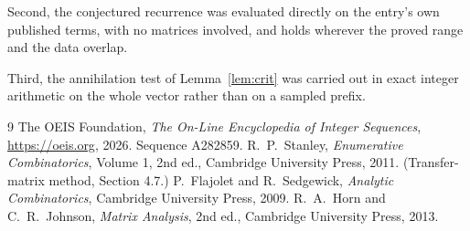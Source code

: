 \documentclass[11pt,a4paper]{article}
\theoremstyle{plain}
\theoremstyle{definition}
\begin{document}
Second, the conjectured recurrence was evaluated directly on the entry's own published terms,
with no matrices involved, and holds wherever the proved range and the data overlap.

Third, the annihilation test of Lemma~\ref{lem:crit} was carried out in exact integer
arithmetic on the whole vector rather than on a sampled prefix.

\begin{thebibliography}{9}
 The OEIS Foundation, \emph{The On-Line Encyclopedia of Integer
Sequences}, \url{https://oeis.org}, 2026. Sequence A282859.
 R.~P.~Stanley, \emph{Enumerative Combinatorics}, Volume 1, 2nd ed.,
Cambridge University Press, 2011. (Transfer-matrix method, Section 4.7.)
 P.~Flajolet and R.~Sedgewick, \emph{Analytic Combinatorics}, Cambridge
University Press, 2009.
 R.~A.~Horn and C.~R.~Johnson, \emph{Matrix Analysis}, 2nd ed., Cambridge
University Press, 2013.
\end{thebibliography}
\end{document}
